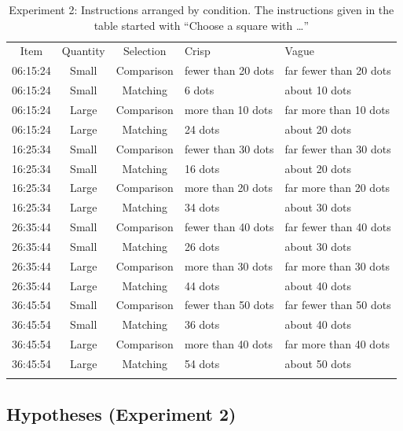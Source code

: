 \documentclass[ %
  graybox       %
 ,envcountchap  %
 ,sectrefs      %
]{svmono}
\begin{document}
\begin{table}
\centering
\caption{Experiment 2: Instructions arranged by condition. The instructions given in the table started with ``Choose a square with \ldots''}
\label{Instructions for e2}
\begin{tabular}{cccll}
\hline\noalign{\smallskip}
Item & Quantity & Selection & Crisp & Vague \\
\noalign{\smallskip}\hline\noalign{\smallskip}
06:15:24 & Small & Comparison & fewer than 20 dots & far fewer than 20 dots \\
06:15:24 & Small & Matching & 6 dots & about 10 dots \\
06:15:24 & Large & Comparison & more than 10 dots & far more than 10 dots \\
06:15:24 & Large & Matching & 24 dots & about 20 dots \\
\noalign{\smallskip}\hline\noalign{\smallskip}
16:25:34 & Small & Comparison & fewer than 30 dots & far fewer than 30 dots \\
16:25:34 & Small & Matching & 16 dots & about 20 dots \\
16:25:34 & Large & Comparison & more than 20 dots & far more than 20 dots \\
16:25:34 & Large & Matching & 34 dots & about 30 dots \\
\noalign{\smallskip}\hline\noalign{\smallskip}
26:35:44 & Small & Comparison & fewer than 40 dots & far fewer than 40 dots \\
26:35:44 & Small & Matching & 26 dots & about 30 dots \\
26:35:44 & Large & Comparison & more than 30 dots & far more than 30 dots \\
26:35:44 & Large & Matching & 44 dots & about 40 dots \\
\noalign{\smallskip}\hline\noalign{\smallskip}
36:45:54 & Small & Comparison & fewer than 50 dots & far fewer than 50 dots \\
36:45:54 & Small & Matching & 36 dots & about 40 dots \\
36:45:54 & Large & Comparison & more than 40 dots & far more than 40 dots \\
36:45:54 & Large & Matching & 54 dots & about 50 dots \\
\noalign{\smallskip}\hline
\end{tabular}
\end{table}

\subsection{Hypotheses (Experiment 2)}
\end{document}
